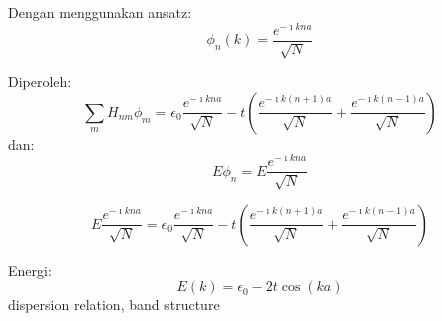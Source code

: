     Dengan menggunakan ansatz: \[
\phi_{n}(k) = \frac{e^{-\imath k n a}}{\sqrt{N}}
\]

    Diperoleh: \[
\sum_{m} H_{nm}\phi_{m} = \epsilon_{0}\frac{e^{-\imath k n a}}{\sqrt{N}} -
t\left(
\frac{e^{-\imath k (n+1) a}}{\sqrt{N}} +
\frac{e^{-\imath k (n-1) a}}{\sqrt{N}}
\right)
\] dan: \[
E\phi_{n} = E \frac{e^{-\imath k n a}}{\sqrt{N}}
\]

\[
E \frac{e^{-\imath k n a}}{\sqrt{N}} = 
\epsilon_{0}\frac{e^{-\imath k n a}}{\sqrt{N}} -
t\left(
\frac{e^{-\imath k (n+1) a}}{\sqrt{N}} +
\frac{e^{-\imath k (n-1) a}}{\sqrt{N}}
\right)
\]

Energi: \[
E(k) = \epsilon_{0} - 2t\cos(ka)
\] dispersion relation, band structure
